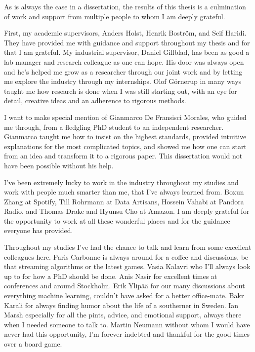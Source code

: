 \begin{acknowledgements}


As is always the case in a dissertation, the results of this thesis is
a culmination of work and support from multiple people to whom I am
deeply grateful.

First, my academic supervisors, Anders Holst, Henrik Bostr\"{o}m, and Seif Haridi.
They have provided me with guidance and support throughout my thesis and for
that I am grateful.
My industrial supervisor, Daniel Gillblad, has been as good a lab manager and
research colleague as one can hope. His door was always open and he's helped me
grow as a researcher through our joint work and by letting me explore the industry through my
internships. Olof G\"{o}rnerup in many ways taught me how research is done when I
was still starting out, with an eye for detail, creative ideas and an adherence to rigorous
methods.

I want to make special mention of Gianmarco De Fransisci Morales, who
guided me through, from a fledgling PhD student to an independent researcher.
Gianmarco taught me how to insist on the highest standards, provided intuitive
explanations for the most complicated topics, and showed me how one can start
from an idea and transform it to a rigorous paper. This dissertation would
not have been possible without his help.

I've been extremely lucky to work in the industry throughout
my studies and work with people much smarter than me, that I've always learned
from. Boxun Zhang at Spotify, Till Rohrmann at Data Artisans, Hossein Vahabi
at Pandora Radio, and Thomas Drake and Hyunsu Cho at Amazon.
I am deeply grateful for the opportunity to work at all these wonderful
places and for the guidance everyone has provided.

Throughout my studies I've had the chance to talk and learn from some
excellent colleagues here. Paris Carbonne is always around
for a coffee and discussions, be that streaming algorithms or the latest
games. Vasia Kalavri who I'll always look up to for how a PhD should be done.
Anis Nasir for excellent times at conferences and around Stockholm.
Erik Ylip\"{a}\"{a} for our many discussions about everything machine
learning, couldn't have asked for a better office-mate.
Bakr Karali for always finding humor about the life of a southerner
in Sweden. Ian Marsh especially for all the pints, advice, and
emotional support, always there when I needed someone to talk to.
Martin Neumann without whom I would have never had this opportunity,
I'm forever indebted and thankful for the good times over a board game.


\end{acknowledgements}
